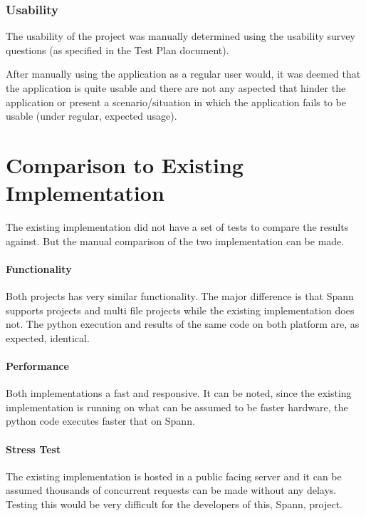 \documentclass[12pt, titlepage]{article}
\begin{document}
  \subsubsection{Usability}
  The usability of the project was manually determined using the usability
  survey questions (as specified in the Test Plan document).

  After manually using the application as a regular user would, it was deemed
  that the application is quite usable and there are not any aspected that hinder
  the application or present a scenario/situation in which the application fails
  to be usable (under regular, expected usage).

\section{Comparison to Existing Implementation}	

The existing implementation did not have a set of tests to compare the results
against. But the manual comparison of the two implementation can be made.

\paragraph{Functionality\\}

Both projects has very similar functionality. The major difference is that
Spann supports projects and multi file projects while the existing
implementation does not. The python execution and results of the same code on
both platform are, as expected, identical.

\paragraph{Performance\\}

Both implementations a fast and responsive. It can be noted, since the existing
implementation is running on what can be assumed to be faster hardware, the
python code executes faster that on Spann.

\paragraph{Stress Test\\}

The existing implementation is hosted in a public facing server and it can be
assumed thousands of concurrent requests can be made without any delays. Testing this
would be very difficult for the developers of this, Spann, project.
\end{document}
